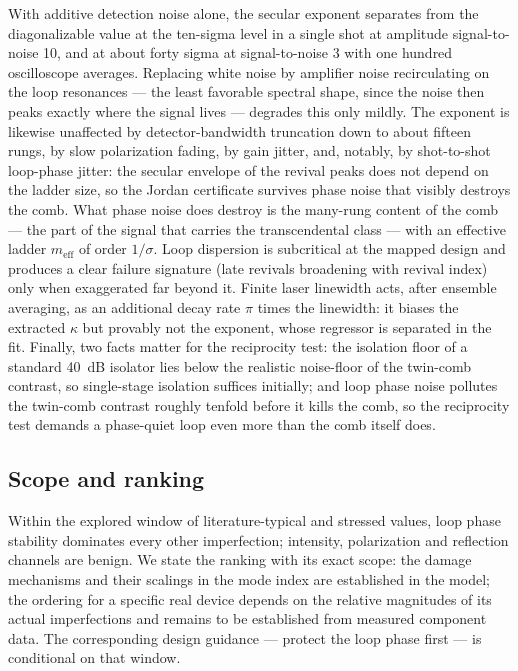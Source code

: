 \documentclass[11pt,a4paper]{article}
\begin{document}
With additive detection noise alone, the secular exponent separates from the
diagonalizable value at the ten-sigma level in a single shot at amplitude
signal-to-noise 10, and at about forty sigma at signal-to-noise 3 with one
hundred oscilloscope averages. Replacing white noise by amplifier noise
recirculating on the loop resonances --- the least favorable spectral shape,
since the noise then peaks exactly where the signal lives --- degrades this
only mildly. The exponent is likewise unaffected by detector-bandwidth
truncation down to about fifteen rungs, by slow polarization fading, by gain
jitter, and, notably, by shot-to-shot loop-phase jitter: the secular envelope
of the revival peaks does not depend on the ladder size, so the Jordan
certificate survives phase noise that visibly destroys the comb. What phase
noise does destroy is the many-rung content of the comb --- the part of the
signal that carries the transcendental class --- with an effective ladder
$m_{\mathrm{eff}}$ of order $1/\sigma$. Loop dispersion is subcritical at the
mapped design and produces a clear failure signature (late revivals broadening
with revival index) only when exaggerated far beyond it. Finite laser linewidth
acts, after ensemble averaging, as an additional decay rate $\pi$ times the
linewidth: it biases the extracted $\kappa$ but provably not the exponent,
whose regressor is separated in the fit. Finally, two facts matter for the
reciprocity test: the isolation floor of a standard 40~dB isolator lies below
the realistic noise-floor of the twin-comb contrast, so single-stage isolation
suffices initially; and loop phase noise pollutes the twin-comb contrast
roughly tenfold before it kills the comb, so the reciprocity test demands a
phase-quiet loop even more than the comb itself does.

\subsection{Scope and ranking}

Within the explored window of literature-typical and stressed values, loop
phase stability dominates every other imperfection; intensity, polarization and
reflection channels are benign. We state the ranking with its exact scope: the
damage mechanisms and their scalings in the mode index are established in the
model; the ordering for a specific real device depends on the relative
magnitudes of its actual imperfections and remains to be established from
measured component data. The corresponding design guidance --- protect the loop
phase first --- is conditional on that window.
\end{document}
